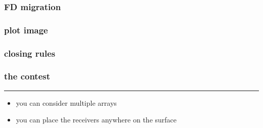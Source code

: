 \begin{frame} \frametitle{FD migration}
\end{frame}
\cwpnote{}

\begin{frame} \frametitle{plot image}
\end{frame}
\cwpnote{}
\begin{frame}  \end{frame} \cwpnote{}

\begin{frame} \frametitle{closing rules}
\end{frame}
\cwpnote{}


\begin{frame} \frametitle{the contest}


\vfill \hrule \vfill

\begin{itemize}
   \item you can consider multiple arrays
   \item you can place the receivers anywhere on the surface
\end{itemize}

\end{frame}
\cwpnote{}

\begin{frame}


\vfill

\begin{center}
\end{center}

\end{frame}
\cwpnote{}

